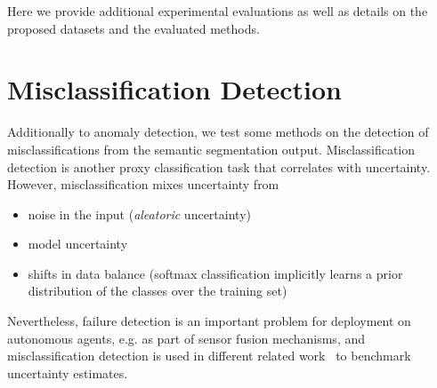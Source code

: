 Here we provide additional experimental evaluations as well as details on the proposed datasets and the evaluated methods.

\section{Misclassification Detection}
\label{sec:misclassification}
Additionally to anomaly detection, we test some methods on the detection of misclassifications from the semantic segmentation output. Misclassification detection is another proxy classification task that correlates with uncertainty. However, misclassification mixes uncertainty from
\begin{itemize}[label={--},leftmargin=*, nosep]
    \item noise in the input (\emph{aleatoric} uncertainty) 
    \item model uncertainty
    \item shifts in data balance (softmax classification implicitly learns a prior distribution of the classes over the training set) 
\end{itemize}
Nevertheless, failure detection is an important problem for deployment on autonomous agents, e.g. as part of sensor fusion mechanisms, and misclassification detection is used in different related work~\cite{Hendrycks2016-ua,Lakshminarayanan2017-zk,Guo2017-kg,Jiang2018-rl} to benchmark uncertainty estimates.


